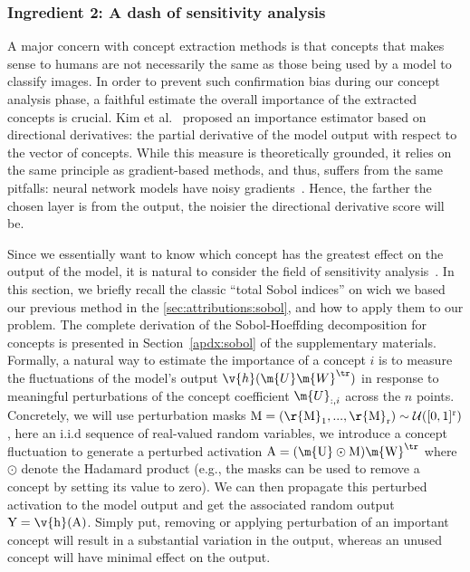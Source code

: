\subsubsection{Ingredient 2: A dash of sensitivity analysis}\label{subsec:sobol}



A major concern with concept extraction methods is that concepts that makes sense to humans are not necessarily the same as those being used by a model to classify images.
In order to prevent such confirmation bias during our concept analysis phase, a faithful estimate the overall importance of the extracted concepts is crucial. 
Kim et al.~\cite{kim2018interpretability} proposed an importance estimator based on directional derivatives: the partial derivative of the model output with respect to the vector of concepts. 
While this measure is theoretically grounded, it relies on the same principle as gradient-based methods, and thus, suffers from the same pitfalls: neural network models have noisy gradients~\cite{smilkov2017smoothgrad,sundararajan2017axiomatic}. Hence, the farther the chosen layer is from the output, the noisier the directional derivative score will be.


Since we essentially want to know which concept has the greatest effect on the output of the model, it is natural to consider the field of sensitivity analysis~\cite{sobol2005global, sobol1993sensitivity, sobol2001, cukier1973study,idrissi2021developments}.
In this section, we briefly recall the classic ``total Sobol indices'' on wich we based our previous method in the \autoref{sec:attributions:sobol}, and how to apply them to our problem. The complete derivation of the Sobol-Hoeffding decomposition for concepts is presented in Section~\ref{apdx:sobol} of the supplementary materials.
Formally, a natural way to estimate the importance of a concept $i$ is to measure the fluctuations of the model's output $\v{h}(\m{U} \m{W}^\tr)$ in response to meaningful perturbations of the concept coefficient $\m{U}_{:,i}$ across the $n$ points.
Concretely, we will use perturbation masks $\rm{M}  = (\r{M}_1, ..., \r{M}_r) \sim \mathcal{U}([0, 1]^r)$, here an i.i.d sequence of real-valued random variables, we introduce a concept fluctuation to generate a perturbed activation $\rm{A} = (\m{U} \odot \rm{M})\m{W}^\tr$ where $\odot$ denote the Hadamard product (e.g., the masks can be used to remove a concept by setting its value to zero). We can then propagate this perturbed activation to the model output and get the associated random output $\rm{Y} = \v{h}(\rm{A})$.
Simply put, removing or applying perturbation of an important concept will result in a substantial variation in the output, whereas an unused concept will have minimal effect on the output.

